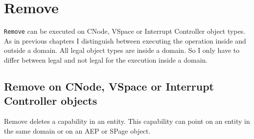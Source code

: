 \section{Remove}\label{sec:Remove}
\texttt{Remove} can be executed on CNode, VSpace or Interrupt Controller object types. \\
As in previous chapters I distinguish between executing the operation inside and outside a domain. All legal object types are inside a domain. So I only have to differ between legal and not legal for the execution inside a domain. 
\subsection{Remove on CNode, VSpace or Interrupt Controller objects} 
Remove deletes a capability in an entity. This capability can point on an entity in the same domain or on an AEP or SPage object. 
